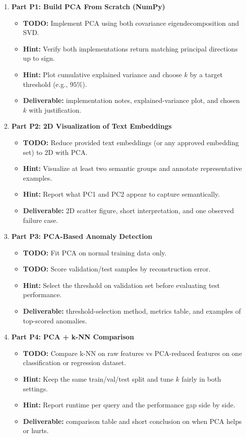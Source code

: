 \begin{enumerate}[label=\textbf{P\arabic*.}]
  \item \textbf{Part P1: Build PCA From Scratch (NumPy)}
  \begin{itemize}
    \item \textbf{TODO:} Implement PCA using both covariance eigendecomposition and SVD.
    \item \textbf{Hint:} Verify both implementations return matching principal directions up to sign.
    \item \textbf{Hint:} Plot cumulative explained variance and choose $k$ by a target threshold (e.g., $95\%$).
    \item \textbf{Deliverable:} implementation notes, explained-variance plot, and chosen $k$ with justification.
  \end{itemize}

  \item \textbf{Part P2: 2D Visualization of Text Embeddings}
  \begin{itemize}
    \item \textbf{TODO:} Reduce provided text embeddings (or any approved embedding set) to 2D with PCA.
    \item \textbf{Hint:} Visualize at least two semantic groups and annotate representative examples.
    \item \textbf{Hint:} Report what PC1 and PC2 appear to capture semantically.
    \item \textbf{Deliverable:} 2D scatter figure, short interpretation, and one observed failure case.
  \end{itemize}

  \item \textbf{Part P3: PCA-Based Anomaly Detection}
  \begin{itemize}
    \item \textbf{TODO:} Fit PCA on normal training data only.
    \item \textbf{TODO:} Score validation/test samples by reconstruction error.
    \item \textbf{Hint:} Select the threshold on validation set before evaluating test performance.
    \item \textbf{Deliverable:} threshold-selection method, metrics table, and examples of top-scored anomalies.
  \end{itemize}

  \item \textbf{Part P4: PCA + k-NN Comparison}
  \begin{itemize}
    \item \textbf{TODO:} Compare k-NN on raw features vs PCA-reduced features on one classification or regression dataset.
    \item \textbf{Hint:} Keep the same train/val/test split and tune $k$ fairly in both settings.
    \item \textbf{Hint:} Report runtime per query and the performance gap side by side.
    \item \textbf{Deliverable:} comparison table and short conclusion on when PCA helps or hurts.
  \end{itemize}
\end{enumerate}

